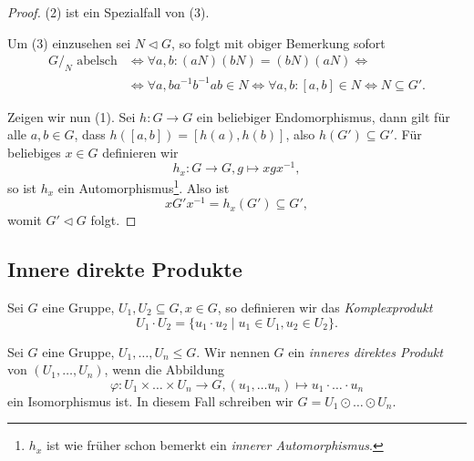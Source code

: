 \begin{proof}
    (2) ist ein Spezialfall von (3).

    Um (3) einzusehen sei $N \vartriangleleft G$, so folgt mit obiger Bemerkung sofort
    \begin{align*}
        G/_N \textrm{ abelsch} &\Leftrightarrow \forall a, b: (aN)(bN) = (bN)(aN) \Leftrightarrow \\ &\Leftrightarrow \forall a, b a^{-1}b^{-1} a b \in N \Leftrightarrow \forall a, b: [a, b] \in N \Leftrightarrow N \subseteq G'.
    \end{align*}

    Zeigen wir nun (1). Sei $h : G \to G$ ein beliebiger Endomorphismus, dann gilt für alle $a, b \in G$, dass $h([a,b]) = [h(a), h(b)]$, also $h(G') \subseteq G'$. Für beliebiges $x \in G$ definieren wir
    $$ h_x : G \to G, g \mapsto xgx^{-1}, $$
    so ist $h_x$ ein Automorphismus\footnote{$h_x$ ist wie früher schon bemerkt ein \emph{innerer Automorphismus}.}. Also ist
    $$ x G' x^{-1} = h_x(G') \subseteq G', $$
    womit $G' \vartriangleleft G$ folgt.
\end{proof}

\subsection{Innere direkte Produkte}

\begin{definition}
    Sei $G$ eine Gruppe, $U_1, U_2 \subseteq G, x \in G$, so definieren wir das \emph{Komplexprodukt}
    $$ U_1 \cdot U_2 = \{ u_1 \cdot u_2 \mid u_1 \in U_1, u_2 \in U_2 \}. $$
\end{definition}

\begin{definition} \label{def:direktes-inneres-produkt}
    Sei $G$ eine Gruppe, $U_1, \hdots, U_n \leq G$. Wir nennen $G$ ein \emph{inneres direktes Produkt} von $(U_1, \hdots, U_n)$, wenn die Abbildung
    $$ \varphi : U_1 \times \hdots \times U_n \to G, (u_1, \hdots u_n) \mapsto u_1 \cdot \hdots \cdot u_n $$
    ein Isomorphismus ist. In diesem Fall schreiben wir $G = U_1 \odot \hdots \odot U_n$.
\end{definition}

